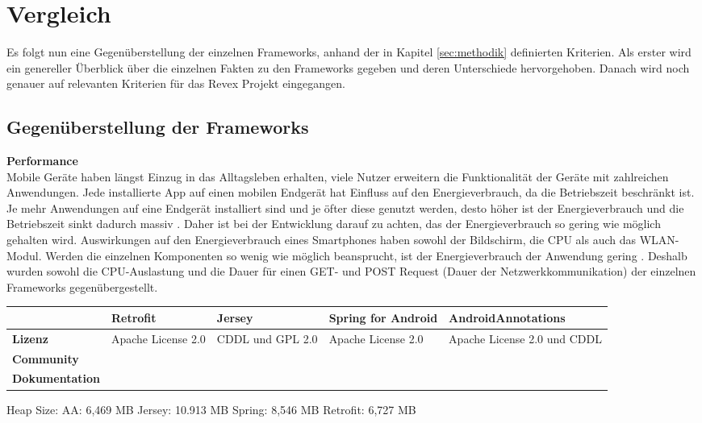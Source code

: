 \chapter{Vergleich}
\label{sec:comparison}
Es folgt nun eine Gegenüberstellung der einzelnen Frameworks, anhand der in Kapitel \ref{sec:methodik} definierten Kriterien. Als erster wird ein genereller Überblick über die einzelnen Fakten zu den Frameworks gegeben und deren Unterschiede hervorgehoben. Danach wird noch genauer auf relevanten Kriterien für das Revex Projekt eingegangen.

\section{Gegenüberstellung der Frameworks}

\textbf{Performance}\\
Mobile Geräte haben längst Einzug in das Alltagsleben erhalten, viele Nutzer erweitern die Funktionalität der Geräte mit zahlreichen Anwendungen. Jede installierte App auf einen mobilen Endgerät hat Einfluss auf den Energieverbrauch, da die Betriebszeit  beschränkt ist. Je mehr Anwendungen auf eine Endgerät installiert sind und je öfter diese genutzt werden, desto höher ist der Energieverbrauch und die Betriebszeit sinkt dadurch massiv \cite{Wil2012}. Daher ist bei der Entwicklung darauf zu achten, das der Energieverbrauch so gering wie möglich gehalten wird. Auswirkungen auf den Energieverbrauch eines Smartphones haben sowohl der Bildschirm, die CPU als auch das WLAN-Modul. Werden die einzelnen Komponenten so wenig wie möglich beansprucht, ist der Energieverbrauch der Anwendung gering \cite{vetter}. Deshalb wurden sowohl die CPU-Auslastung und die Dauer für einen GET- und POST Request (Dauer der Netzwerkkommunikation) der einzelnen Frameworks gegenübergestellt. 


\begin{landscape}
	
\begin{tabular}{p{3cm}|p{4.8cm}|p{4.8cm}|p{4.8cm}|p{4.8cm}}
   & \textbf{Retrofit} & \textbf{Jersey} & \textbf{Spring for Android}  & \textbf{AndroidAnnotations}  \\  \hline
  \textbf{Lizenz} &
  Apache License 2.0 & 
  CDDL und GPL 2.0 & 
  Apache License 2.0 & 
  Apache License 2.0 und CDDL \\ \hline
  \textbf{Community} \\ \hline
  \textbf{Dokumentation} \\ \hline
\end{tabular} 

Heap Size:
AA: 6,469 MB	
Jersey: 10.913 MB
Spring: 8,546 MB
Retrofit: 6,727 MB

\end{landscape}


